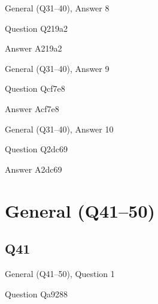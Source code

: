 \documentclass[11pt]{beamer}
\begin{document}
\begin{frame}[t]{General (Q31--40), Answer 8}
\vspace{2em}
\begin{block}{Question}
Q219a2
\end{block}
\pause{}
\begin{block}{Answer}
A219a2
\end{block}
\end{frame}
    

\begin{frame}[t]{General (Q31--40), Answer 9}
\vspace{2em}
\begin{block}{Question}
Qcf7e8
\end{block}
\pause{}
\begin{block}{Answer}
Acf7e8
\end{block}
\end{frame}
    

\begin{frame}[t]{General (Q31--40), Answer 10}
\vspace{2em}
\begin{block}{Question}
Q2dc69
\end{block}
\pause{}
\begin{block}{Answer}
A2dc69
\end{block}
\end{frame}
    

\section{General (Q41--50)}
    

\subsection*{Q41}
\begin{frame}[t]{General (Q41--50), Question 1}
\vspace{2em}
\begin{block}{Question}
Qa9288
\end{block}
\begin{center}


\end{center}
\end{frame}
    
\end{document}

